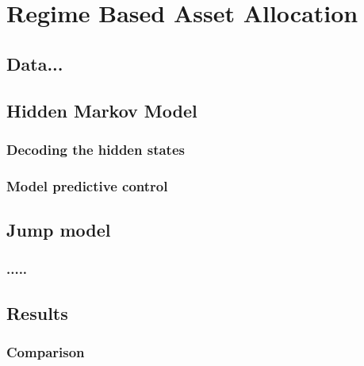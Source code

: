 \newpage

\section{Regime Based Asset Allocation}

\subsection{Data...}

\subsection{Hidden Markov Model}

\subsubsection{Decoding the hidden states}

\subsubsection{Model predictive control}

\subsection{Jump model}

\subsubsection{.....}



\subsection{Results}

\subsubsection{Comparison}
